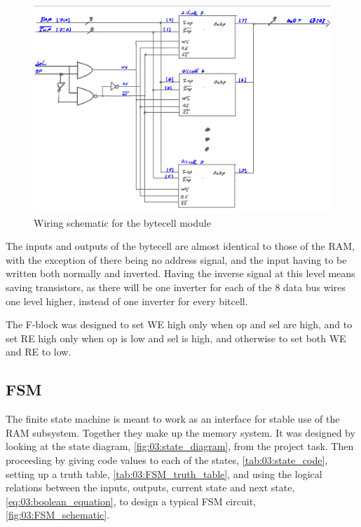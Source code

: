 \begin{figure}[H]
    \centering
    \includegraphics[width=0.8\linewidth]{LaTeX_2/Figures/bytecell_schematic.png}
    \caption{Wiring schematic for the bytecell module}
    \label{fig:03:bytecell_schematic}
\end{figure}

The inputs and outputs of the bytecell are almost identical to those of the RAM, with the exception of there being no address signal, and the input having to be written both normally and inverted. Having the inverse signal at this level means saving transistors, as there will be one inverter for each of the 8 data bus wires one level higher, instead of one inverter for every bitcell.

The F-block was designed to set WE high only when op and sel are high, and to set RE high only when op is low and sel is high, and otherwise to set both WE and RE to low.


\subsection{FSM}
The finite state machine is meant to work as an interface for stable use of the RAM subsystem. Together they make up the memory system. It was designed by looking at the state diagram, \autoref{fig:03:state_diagram}, from the project task. Then proceeding by giving code values to each of the states, \autoref{tab:03:state_code}, setting up a truth table, \autoref{tab:03:FSM_truth_table}, and using the logical relations between the inputs, outputs, current state and next state, \autoref{eq:03:boolean_equation}, to design a typical FSM circuit, \autoref{fig:03:FSM_schematic}.


